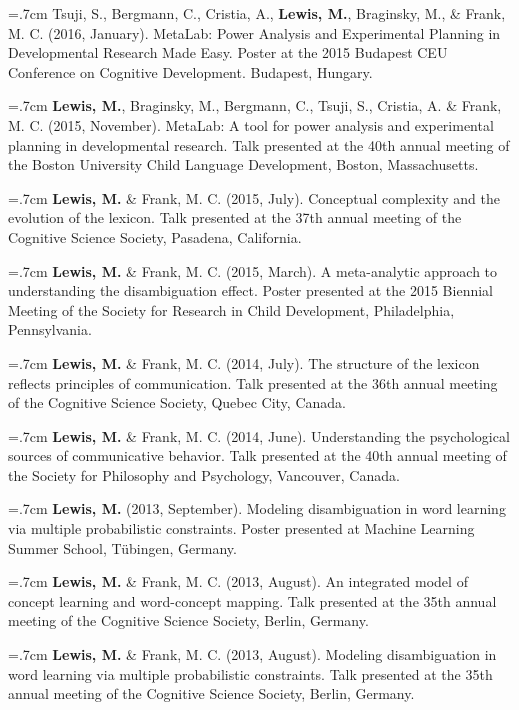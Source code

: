 \documentclass[letterpaper]{article}
\begin{document}
  \hangindent=.7cm  Tsuji, S., Bergmann, C., Cristia, A., {\bf Lewis, M.}, Braginsky, M., \& Frank, M. C. (2016, January). MetaLab: Power Analysis and Experimental Planning in Developmental Research Made Easy. Poster at the 2015 Budapest CEU Conference on Cognitive Development. Budapest, Hungary.


\hangindent=.7cm {\bf Lewis, M.},  Braginsky,  M.,  Bergmann, C., Tsuji, S., Cristia, A. \& Frank, M. C. (2015, November). MetaLab: A tool for power analysis and experimental planning in developmental research. Talk presented at the 40th annual meeting of the Boston University Child Language Development, Boston, Massachusetts.

\hangindent=.7cm {\bf Lewis, M.} \& Frank, M. C. (2015, July). Conceptual complexity and the evolution of the lexicon. Talk presented at the 37th annual meeting of the Cognitive Science Society, Pasadena, California.

\hangindent=.7cm {\bf Lewis, M.} \& Frank, M. C. (2015, March). A meta-analytic approach to understanding the disambiguation effect. Poster presented at  the 2015 Biennial Meeting of the Society for Research in Child Development, Philadelphia, Pennsylvania.


\hangindent=.7cm {\bf Lewis, M.} \& Frank, M. C. (2014, July). The structure of the lexicon reflects  principles of communication. Talk presented at the 36th annual meeting of the Cognitive Science Society, Quebec City, Canada.

\hangindent=.7cm {\bf Lewis, M.} \& Frank, M. C. (2014, June). Understanding the psychological sources of communicative behavior. Talk presented at the 40th annual meeting of the Society for Philosophy and Psychology, Vancouver, Canada.

 \hangindent=.7cm {\bf Lewis, M.} (2013, September). Modeling disambiguation in word learning via multiple probabilistic constraints. Poster presented at Machine Learning Summer School, T\"{u}bingen, Germany.
 

 \hangindent=.7cm {\bf Lewis, M.}  \& Frank, M. C. (2013, August). An integrated model of concept learning and word-concept mapping. Talk presented at the 35th annual meeting of the Cognitive Science Society, Berlin, Germany.
 
 \hangindent=.7cm {\bf Lewis, M.}  \& Frank, M. C.  (2013, August). Modeling disambiguation in word learning via multiple probabilistic constraints. Talk presented at the 35th annual meeting of the Cognitive Science Society, Berlin, Germany.
 
\end{document}
